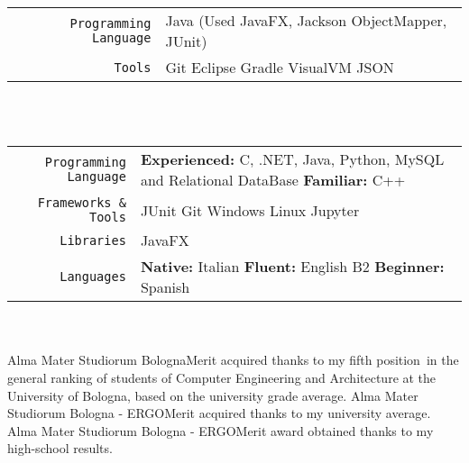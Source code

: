 \documentclass[
    10pt,
    A4,
    english,
    draft = false,
    twoside = false,
]{article}
\begin{document}
	\tab \begin{tabular}{r p{}}
		\texttt{\large Programming Language} &  Java (Used JavaFX, Jackson ObjectMapper, JUnit) \\
		\texttt{\large Tools} & Git \cvContactSep Eclipse \cvContactSep Gradle \cvContactSep VisualVM \cvContactSep JSON \\
	\end{tabular}\\~\\
	{}
	{}
	{}
	\tab \begin{tabular}{r p{}}
		\texttt{\large Programming Language} & \textbf{Experienced:} C, .NET, Java, Python, MySQL and Relational DataBase \textbf{Familiar:} C++ \\
		\texttt{\large Frameworks \& Tools} & JUnit \cvContactSep Git \cvContactSep Windows \cvContactSep Linux \cvContactSep Jupyter \\
		\texttt{\large Libraries} & JavaFX\\
		\texttt{\large Languages} & \textbf{Native:} Italian \cvContactSep \textbf{Fluent:} English B2 \cvContactSep \textbf{Beginner:} Spanish \\
	\end{tabular}\\~\\
	\newpage
	{Alma Mater Studiorum Bologna}{Merit acquired thanks to my fifth position\ in the general ranking of students of Computer Engineering and Architecture
    at the University of Bologna, based on the university grade average.}
	{Alma Mater Studiorum Bologna - ERGO}{Merit acquired thanks to my university average.}
	{Alma Mater Studiorum Bologna - ERGO}{Merit award obtained thanks to my high-school results.}
	
\end{document}
